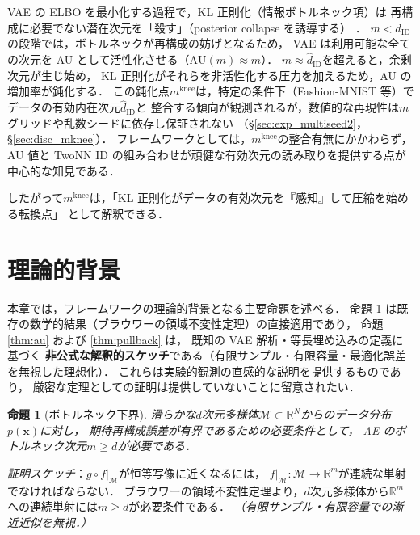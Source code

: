 \documentclass[11pt,a4paper]{jsarticle}
\newtheorem{proposition}{命題}
\newcommand{\R}{\mathbb{R}}
\newcommand{\mknee}{m^{\mathrm{knee}}}
\begin{document}
VAE の ELBO を最小化する過程で，KL 正則化（情報ボトルネック項）は
再構成に必要でない潜在次元を「殺す」（posterior collapse を誘導する）
\cite{lucas2019elbo,higgins2017betavae}．
$m < \hat{d}_\mathrm{ID}$の段階では，ボトルネックが再構成の妨げとなるため，
VAE は利用可能な全ての次元を AU として活性化させる（$\mathrm{AU}(m) \approx m$）．
$m \approx \hat{d}_\mathrm{ID}$を超えると，余剰次元が生じ始め，
KL 正則化がそれらを非活性化する圧力を加えるため，AU の増加率が鈍化する．
この鈍化点$\mknee$は，特定の条件下（Fashion-MNIST 等）でデータの有効内在次元$\hat{d}_\mathrm{ID}$と
整合する傾向が観測されるが，数値的な再現性は$m$グリッドや乱数シードに依存し保証されない
（§\ref{sec:exp_multiseed2}，§\ref{sec:disc_mknee}）．
フレームワークとしては，$\mknee$の整合有無にかかわらず，
AU 値と TwoNN ID の組み合わせが頑健な有効次元の読み取りを提供する点が中心的な知見である．

したがって$\mknee$は，「KL 正則化がデータの有効次元を『感知』して圧縮を始める転換点」
として解釈できる．

\section{理論的背景}\label{sec:theory}

本章では，フレームワークの理論的背景となる主要命題を述べる．
命題 \ref{thm:lower_bound} は既存の数学的結果（ブラウワーの領域不変性定理）の直接適用であり，
命題 \ref{thm:au} および \ref{thm:pullback} は，
既知の VAE 解析\cite{lucas2019elbo}・等長埋め込みの定義に基づく
\textbf{非公式な解釈的スケッチ}である（有限サンプル・有限容量・最適化誤差を無視した理想化）．
これらは実験的観測の直感的な説明を提供するものであり，
厳密な定理としての証明は提供していないことに留意されたい．

\begin{proposition}[ボトルネック下界]\label{thm:lower_bound}
滑らかな$d$次元多様体$\mathcal{M} \subset \R^N$からのデータ分布$p(\boldsymbol{x})$に対し，
期待再構成誤差が有界であるための必要条件として，
AE のボトルネック次元$m \geq d$が必要である．
\end{proposition}

\textit{証明スケッチ}：$g \circ f|_\mathcal{M}$が恒等写像に近くなるには，
$f|_\mathcal{M}: \mathcal{M} \to \R^m$が連続な単射でなければならない．
ブラウワーの領域不変性定理より，$d$次元多様体から$\R^m$への連続単射には$m \geq d$が必要条件である．
\textit{（有限サンプル・有限容量での漸近近似を無視．）}
\end{document}
